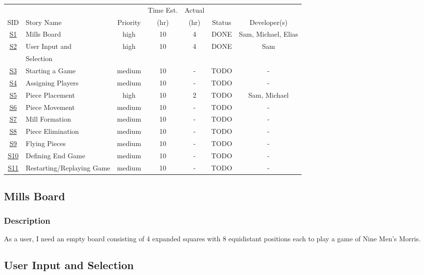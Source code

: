 \documentclass[11pt]{article}
\begin{document}
\begin{center}
\begin{tabular}{|c|m{3.5cm}|c|c|c|c|c|}
 &  &  & Time Est. & Actual &  & \\
SID & Story Name & Priority & (hr) & (hr) & Status & Developer(s)\\
\hline
\hyperref[sec:orgdc477c4]{S1} & Mills Board & high & 10 & 4 & DONE & Sam, Michael, Elias\\
\hline
\hyperref[sec:org1c15105]{S2} & User Input and & high & 10 & 4 & DONE & Sam\\
 & Selection &  &  &  &  & \\
\hline
\hyperref[sec:orgf5686f2]{S3} & Starting a Game & medium & 10 & - & TODO & -\\
\hline
\hyperref[sec:org6e77543]{S4} & Assigning Players & medium & 10 & - & TODO & -\\
\hline
\hyperref[sec:org1d44624]{S5} & Piece Placement & high & 10 & 2 & TODO & Sam, Michael\\
\hline
\hyperref[sec:org9dfb1ac]{S6} & Piece Movement & medium & 10 & - & TODO & -\\
\hline
\hyperref[sec:orgafa5142]{S7} & Mill Formation & medium & 10 & - & TODO & -\\
\hline
\hyperref[sec:org559605a]{S8} & Piece Elimination & medium & 10 & - & TODO & -\\
\hline
\hyperref[sec:orgdfbe288]{S9} & Flying Pieces & medium & 10 & - & TODO & -\\
\hline
\hyperref[sec:orgbc7ca63]{S10} & Defining End Game & medium & 10 & - & TODO & -\\
\hline
\hyperref[sec:org0235120]{S11} & Restarting/Replaying Game & medium & 10 & - & TODO & -\\
\end{tabular}
\end{center}


\subsection{Mills Board}
\label{sec:orgdc477c4}
\subsubsection*{Description}
\label{sec:org624b4a5}
As a user, I need an empty board consisting of 4 expanded squares with 8 equidistant positions
each to play a game of Nine Men's Morris.
\subsection{User Input and Selection}
\label{sec:org1c15105}
\end{document}

